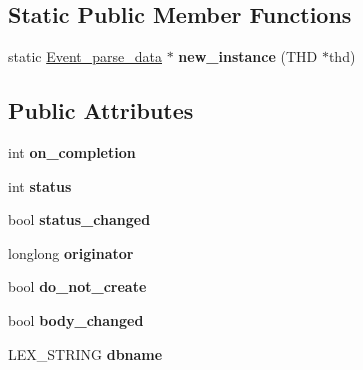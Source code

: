 \subsection*{Static Public Member Functions}
\begin{DoxyCompactItemize}
\item 
\mbox{\label{classEvent__parse__data_a88845a935334813cb40133c49e173023}} 
static \mbox{\hyperlink{classEvent__parse__data}{Event\+\_\+parse\+\_\+data}} $\ast$ {\bfseries new\+\_\+instance} (T\+HD $\ast$thd)
\end{DoxyCompactItemize}
\subsection*{Public Attributes}
\begin{DoxyCompactItemize}
\item 
\mbox{\label{classEvent__parse__data_aac30acc95ca8069799c11df7b903ffe5}} 
int {\bfseries on\+\_\+completion}
\item 
\mbox{\label{classEvent__parse__data_ac640bf659bedb15646316f8141caf100}} 
int {\bfseries status}
\item 
\mbox{\label{classEvent__parse__data_aef4d017d0261fb9e17f41325d404e704}} 
bool {\bfseries status\+\_\+changed}
\item 
\mbox{\label{classEvent__parse__data_ae31aa672e7b47a5f8210a54cea551abe}} 
longlong {\bfseries originator}
\item 
\mbox{\label{classEvent__parse__data_aa84ee955aaa25538585965b9b2604d0a}} 
bool {\bfseries do\+\_\+not\+\_\+create}
\item 
\mbox{\label{classEvent__parse__data_ad5fb93903f96f123ec7cb34cab596461}} 
bool {\bfseries body\+\_\+changed}
\item 
\mbox{\label{classEvent__parse__data_a022ecb31d8cc9f67c8c9fa2c80b1b8cc}} 
L\+E\+X\+\_\+\+S\+T\+R\+I\+NG {\bfseries dbname}
\item 
\mbox{\label{classEvent__parse__data_abfdbc3af4d2cf60eeaa963a7a93852e4}} 

\end{DoxyCompactItemize}
